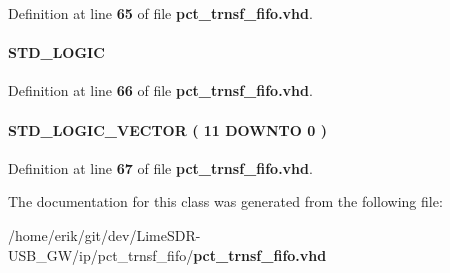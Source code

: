 Definition at line {\bf 65} of file {\bf pct\+\_\+trnsf\+\_\+fifo.\+vhd}.

\paragraph[{sub\+\_\+wire3}]{ {\bfseries \textcolor{comment}{S\+T\+D\+\_\+\+L\+O\+G\+IC}\textcolor{vhdlchar}{ }} \hspace{0.3cm}{\ttfamily [Signal]}}\label{classpct__trnsf__fifo_1_1SYN_a0787f387a1b32ddcff294933578a1298}


Definition at line {\bf 66} of file {\bf pct\+\_\+trnsf\+\_\+fifo.\+vhd}.

\paragraph[{sub\+\_\+wire4}]{ {\bfseries \textcolor{comment}{S\+T\+D\+\_\+\+L\+O\+G\+I\+C\+\_\+\+V\+E\+C\+T\+OR}\textcolor{vhdlchar}{ }\textcolor{vhdlchar}{(}\textcolor{vhdlchar}{ }\textcolor{vhdlchar}{ } \textcolor{vhdldigit}{11} \textcolor{vhdlchar}{ }\textcolor{keywordflow}{D\+O\+W\+N\+TO}\textcolor{vhdlchar}{ }\textcolor{vhdlchar}{ } \textcolor{vhdldigit}{0} \textcolor{vhdlchar}{ }\textcolor{vhdlchar}{)}\textcolor{vhdlchar}{ }} \hspace{0.3cm}{\ttfamily [Signal]}}\label{classpct__trnsf__fifo_1_1SYN_af25b27d63f7d26f1e938f04b68c70972}


Definition at line {\bf 67} of file {\bf pct\+\_\+trnsf\+\_\+fifo.\+vhd}.



The documentation for this class was generated from the following file\+:\begin{DoxyCompactItemize}
\item 
/home/erik/git/dev/\+Lime\+S\+D\+R-\/\+U\+S\+B\+\_\+\+G\+W/ip/pct\+\_\+trnsf\+\_\+fifo/{\bf pct\+\_\+trnsf\+\_\+fifo.\+vhd}\end{DoxyCompactItemize}
